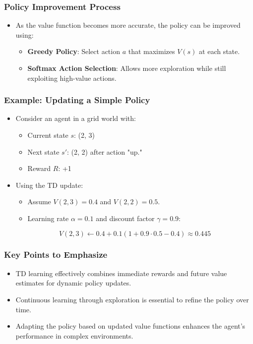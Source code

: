 \documentclass[aspectratio=169]{beamer}
\begin{document}
\begin{frame}[fragile]
    \frametitle{Policy Improvement Process}
    \begin{itemize}
        \item As the value function becomes more accurate, the policy can be improved using:
        \begin{itemize}
            \item \textbf{Greedy Policy}: Select action \( a \) that maximizes \( V(s) \) at each state.
            \item \textbf{Softmax Action Selection}: Allows more exploration while still exploiting high-value actions.
        \end{itemize}
    \end{itemize}
\end{frame}

\begin{frame}[fragile]
    \frametitle{Example: Updating a Simple Policy}
    \begin{itemize}
        \item Consider an agent in a grid world with:
            \begin{itemize}
                \item Current state \( s \): (2, 3)
                \item Next state \( s' \): (2, 2) after action "up."
                \item Reward \( R \): +1
            \end{itemize}
        \item Using the TD update:
            \begin{itemize}
                \item Assume \( V(2, 3) = 0.4 \) and \( V(2, 2) = 0.5 \).
                \item Learning rate \( \alpha = 0.1 \) and discount factor \( \gamma = 0.9 \):
            \end{itemize}
        \begin{equation}
            V(2, 3) \leftarrow 0.4 + 0.1 \left( 1 + 0.9 \cdot 0.5 - 0.4 \right) \approx 0.445
        \end{equation}
    \end{itemize}
\end{frame}

\begin{frame}[fragile]
    \frametitle{Key Points to Emphasize}
    \begin{itemize}
        \item TD learning effectively combines immediate rewards and future value estimates for dynamic policy updates.
        \item Continuous learning through exploration is essential to refine the policy over time.
        \item Adapting the policy based on updated value functions enhances the agent's performance in complex environments.
    \end{itemize}
\end{frame}
\end{document}
